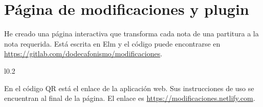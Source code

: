     \newpage
    
    \section{Página de modificaciones y plugin}
   
    He creado una página interactiva que transforma cada nota de una partitura a la nota requerida. Está escrita en Elm y el código puede encontrarse en \url{https://gitlab.com/dodecafonismo/modificaciones}.
   
    \begin{wrapfigure}{l}{0.2\textwidth}
    	\vspace*{-\bigskipamount}
    	\vspace*{-2\bigskipamount}
    \end{wrapfigure} En el código QR está el enlace de la aplicación web. Sus instrucciones de uso se encuentran al final de la página. El enlace es \url{https://modificaciones.netlify.com}.
    
